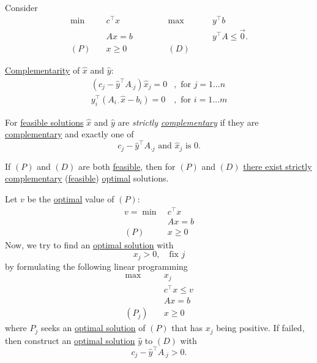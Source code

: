 \begin{eg}
	Consider
	\[
		\begin{alignedat}{5}
			\min~&c^{\top}x\qquad\qquad&&\max ~&&y^{\top}b\\
			&Ax = b 				&&		&&y^{\top}A\leq \vec{0}.\\
			(P)\quad	&x\geq  0 	&&(D)\quad&&
		\end{alignedat}
	\]
	\begin{prev}
		\hyperref[def:complementary]{Complementarity} of \(\hat{x}\) and \(\hat{y}\)\(\colon\)
		\[
			\begin{split}
				(c_{j} - \hat{y}^{\top} A_{\cdot j}) \hat{x}_j = 0&, \text{ for }j = 1\ldots n\\
				y^{\top}_i (A_{i\cdot}\hat{x} - b_{i}) = 0&, \text{ for } i = 1\ldots m
			\end{split}
		\]
	\end{prev}

	\begin{definition}
		For \hyperref[def:feasible-solution]{feasible solutions} \(\hat{x}\) and \(\hat{y}\) are \emph{strictly \hyperref[def:complementary]{complementary}} if
		they are \hyperref[def:complementary]{complementary} and exactly one of
		\[
			c_{j} - \hat{y}^{\top}A_{\cdot j}\text{ and }\hat{x}_j \text{ is } 0.
		\]
	\end{definition}

	\begin{theorem}\label{thm:strictly-complementarity}
		If \((P)\) and \((D)\) are both \hyperref[def:feasible-solution]{feasible}, then for \((P)\) and \((D)\) \underline{there exist strictly}
		\hyperref[def:complementary]{complementary} (\hyperref[def:feasible-solution]{feasible}) \hyperref[def:optimal-solution]{optimal} solutions.
	\end{theorem}

	\begin{intuition}
		Let \(v\) be the \hyperref[def:optimal-solution]{optimal} value of \((P)\)\(\colon\)
		\[
			\begin{aligned}
				v = \min~ & c^{\top}x \\
				          & Ax = b    \\
				(P)\quad  & x\geq 0
			\end{aligned}
		\]
		Now, we try to find an \hyperref[def:optimal-solution]{optimal solution} with
		\[
			x_{j}>0, \quad \text{fix }j
		\]
		by formulating the following linear programming
		\[
			\begin{aligned}
				\max~      & x_{j}           \\
				           & c^{\top}x\leq v \\
				           & Ax = b          \\
				(P_j)\quad & x\geq  0
			\end{aligned}
		\]
		where \(P_{j}\) seeks an \hyperref[def:optimal-solution]{optimal solution} of \((P)\) that has \(x_{j}\) being positive.
		If failed, then construct an \hyperref[def:optimal-solution]{optimal solution} \(\hat{y}\) to \((D)\) with
		\[
			c_{j} - \hat{y}^{\top} A_{\cdot j}>0.
		\]


\end{intuition}
\end{eg}
